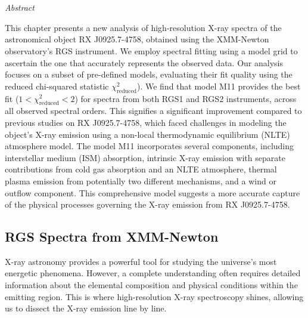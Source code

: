\chapter{\MakeUppercase{\ChapterTitleFour}} \label{chap:hi-resolution}
    \minitoc
    
    \newpage
    \begin{center}
    	\emph{Abstract}
    \end{center}
    This chapter presents a new analysis of high-resolution X-ray spectra of the astronomical object RX J0925.7-4758, obtained using the XMM-Newton observatory's RGS instrument. We employ spectral fitting using a model grid to ascertain the one that accurately represents the observed data. Our analysis focuses on a subset of pre-defined models, evaluating their fit quality using the reduced chi-squared statistic $\chi^2_\text{reduced}$). We find that model M11 provides the best fit ($1<\chi^2_\text{reduced}<2$) for spectra from both RGS1 and RGS2 instruments, across all observed spectral orders. This signifies a significant improvement compared to previous studies on RX J0925.7-4758, which faced challenges in modeling the object's X-ray emission using a non-local thermodynamic equilibrium (NLTE) atmosphere model. The model M11 incorporates several components, including interstellar medium (ISM) absorption, intrinsic X-ray emission with separate contributions from cold gas absorption and an NLTE atmosphere, thermal plasma emission from potentially two different mechanisms, and a wind or outflow component. This comprehensive model suggests a more accurate capture of the physical processes governing the X-ray emission from RX J0925.7-4758.

	\newpage
	\section{RGS Spectra from XMM-Newton} \label{hi-resolution:rgs-spec}
		X-ray astronomy provides a powerful tool for studying the universe's most energetic phenomena. However, a complete understanding often requires detailed information about the elemental composition and physical conditions within the emitting region. This is where high-resolution X-ray spectroscopy shines, allowing us to dissect the X-ray emission line by line.
		
